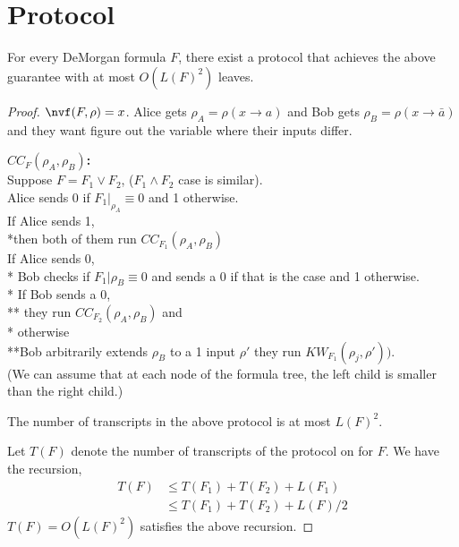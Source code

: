 \section{Protocol}
\begin{lemma}
    \label{lem: protocol}
    For every DeMorgan formula $F$, there exist a protocol that achieves the above guarantee with at most $O(L(F)^2)$ leaves.
\end{lemma}
  
\begin{proof}
    $\nvf(F,\rho) = x$.
    Alice gets $\rho_A = \rho(x \to a)$ and Bob gets $\rho_B = \rho(x \to \bar{a})$ and they want figure out the variable where their inputs differ.
    
    {\bf$CC_F(\rho_A,\rho_B)$:}\\
    Suppose $F = F_1 \vee F_2$, ($F_1 \wedge F_2$ case is similar).\\
    Alice sends 0 if $F_1|_{\rho_A} \equiv 0$ and 1 otherwise.\\ 
    If Alice sends 1,\\ 
        *then both of them run $CC_{F_1}(\rho_A,\rho_B)$\\
    If Alice sends 0, \\
    * Bob checks if $F_1|{\rho_B} \equiv 0$ and sends a 0 if that is the case and 1 otherwise.\\ 
    * If Bob sends a 0, \\
        ** they run $CC_{F_2}(\rho_A,\rho_B)$ and \\
    * otherwise \\
        **Bob arbitrarily extends $\rho_B$ to a 1 input $\rho'$ they run $KW_{F_1}(\rho_j,\rho'))$.\\ 
    
    
    (We can assume that at each node of the formula tree, the left child is smaller than the right child.)\\
    \begin{claim}[Complexity]
        The number of transcripts in the above protocol is at most $L(F)^2$.
    \end{claim}
    
    
    Let $T(F)$ denote the number of transcripts of the protocol on for $F$. We have the recursion,\\
    \begin{align*}
        T(F) &\leq T(F_1)+ T(F_2) + L(F_1)\\
            &\leq T(F_1) + T(F_2) + L(F)/2 
    \end{align*}        
    $T(F) = O(L(F)^2)$ satisfies the above recursion.
\end{proof}

